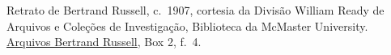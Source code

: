 Retrato de Bertrand Russell, c.~1907, cortesia da Divisão William Ready
de Arquivos e Coleções de Investigação, Biblioteca da McMaster University.
\href{http://www.mcmaster.ca/russdocs/russell.htm}{Arquivos Bertrand Russell}, Box 2, f.~4.
